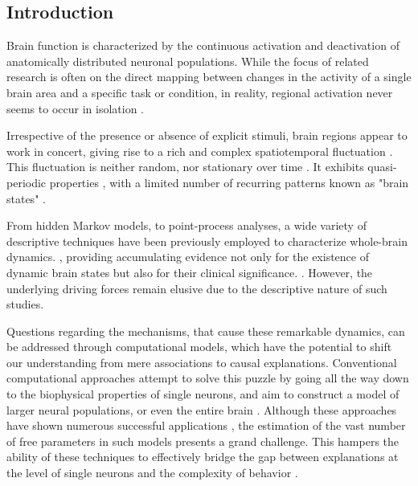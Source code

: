 \documentclass{article}
\begin{document}
\subsection{Introduction}\label{Introduction}

Brain function is characterized by the continuous activation and deactivation of anatomically distributed neuronal
populations.
While the focus of related research is often on the direct mapping between changes in the activity of a single brain
area and a specific task or condition, in reality, regional activation never seems to occur in isolation
\citep{bassett2017network}.

Irrespective of the presence or absence of explicit stimuli, brain regions appear to work in concert, giving rise to a
rich and complex spatiotemporal fluctuation \citep{gutierrez2019infraslow}.
This fluctuation is neither random, nor stationary over time \citep{liu2013time, zalesky2014time}.
It exhibits quasi-periodic properties \citep{thompson2014quasi}, with a limited number of
recurring patterns known as "brain states" \citep{greene2023everyone, vidaurre2017brain, liu2013time, richiardi2011decoding}.

From hidden Markov models, to point-process analyses, a wide variety of descriptive techniques have been previously
employed to characterize whole-brain dynamics. \citep{smith2012temporally, vidaurre2017brain, liu2013time, chen2018human},
providing accumulating evidence not only for the existence of dynamic brain states but also for their clinical
significance. \citep{hutchison2013dynamic, barttfeld2015signature, meer2020movie}.
However, the underlying driving forces remain elusive due to the descriptive nature of such studies.

Questions regarding the mechanisms, that cause these remarkable dynamics, can be addressed through computational models, which have the potential to shift our understanding from mere associations to causal
explanations.
Conventional computational approaches attempt to solve this puzzle by going all the way down to the biophysical properties
of single neurons, and aim to construct a model of larger neural populations, or even the entire brain
\citep{breakspear2017dynamic}.
Although these approaches have shown numerous successful applications \citep{murray2018biophysical, kriegeskorte2018cognitive, heinz2019towards},
the estimation of the vast number of free parameters in such models presents a grand challenge.
This hampers the ability of these techniques to effectively bridge the gap between explanations at the level of single
neurons and the complexity of behavior \citep{breakspear2017dynamic}.
\end{document}
